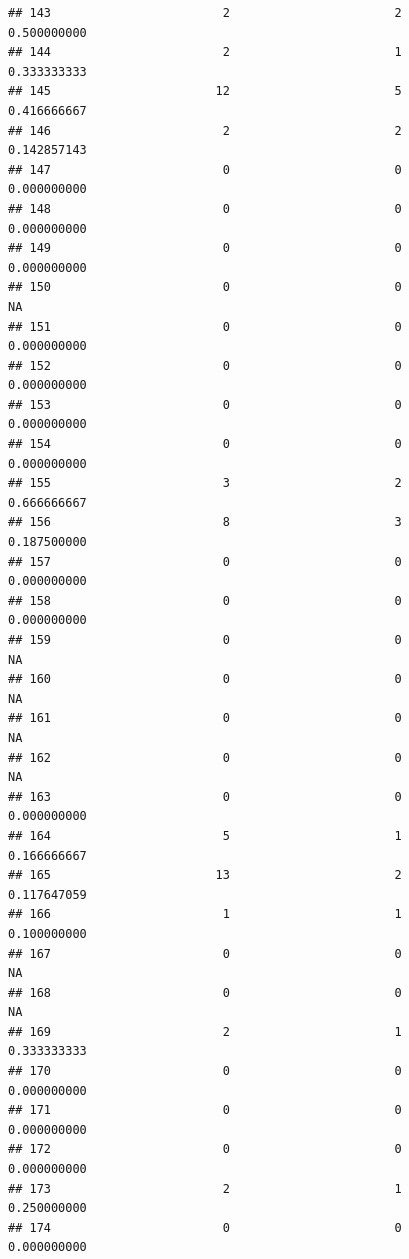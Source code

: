 \documentclass[
]{article}
\begin{document}
\begin{verbatim}
## 143                        2                       2               0.500000000
## 144                        2                       1               0.333333333
## 145                       12                       5               0.416666667
## 146                        2                       2               0.142857143
## 147                        0                       0               0.000000000
## 148                        0                       0               0.000000000
## 149                        0                       0               0.000000000
## 150                        0                       0                        NA
## 151                        0                       0               0.000000000
## 152                        0                       0               0.000000000
## 153                        0                       0               0.000000000
## 154                        0                       0               0.000000000
## 155                        3                       2               0.666666667
## 156                        8                       3               0.187500000
## 157                        0                       0               0.000000000
## 158                        0                       0               0.000000000
## 159                        0                       0                        NA
## 160                        0                       0                        NA
## 161                        0                       0                        NA
## 162                        0                       0                        NA
## 163                        0                       0               0.000000000
## 164                        5                       1               0.166666667
## 165                       13                       2               0.117647059
## 166                        1                       1               0.100000000
## 167                        0                       0                        NA
## 168                        0                       0                        NA
## 169                        2                       1               0.333333333
## 170                        0                       0               0.000000000
## 171                        0                       0               0.000000000
## 172                        0                       0               0.000000000
## 173                        2                       1               0.250000000
## 174                        0                       0               0.000000000

\end{verbatim}
\end{document}
